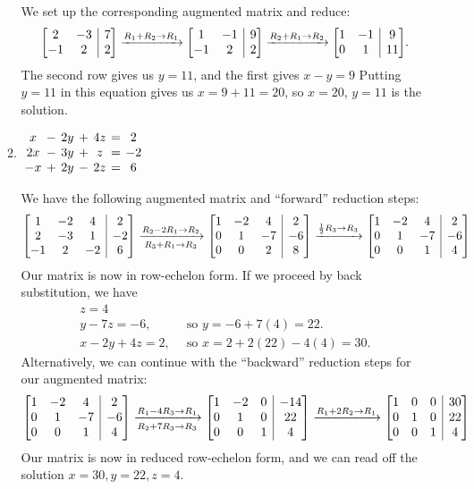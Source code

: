 \documentclass[12pt]{article}
\makeatletter
\newenvironment{amatrix}[1]{%
  \left[\begin{array}{@{}*{#1}{c}|c@{}}
}{%
  \end{array}\right]
}
\newcommand{\bam}{\begin{amatrix}}
\newcommand{\eam}{\end{amatrix}}
\makeatother
\begin{document}
\begin{enumerate}
\begin{enumerate}
We set up the corresponding augmented matrix and reduce:
\[
\bam{2}2&-3&7\\-1&2&2\eam \xrightarrow{R_1+R_2\to R_1} \bam{2} 1&-1&9\\-1&2&2\eam \xrightarrow{R_2+R_1\to R_2}\bam{2}1&-1&9\\0&1&11\eam.
\]
The second row gives us $y=11$, and the first gives $x-y=9$ Putting $y=11$ in this equation gives us $x=9+11=20$, so $x=20$, $y=11$ is the solution.

\item $\arraycolsep2pt\begin{array}{ccccccc}
x&-&2y&+&4z&=&2\\2x&-&3y&+&z&=&-2\\-x&+&2y&-&2z&=&6\end{array}$

We have the following augmented matrix and ``forward'' reduction steps:
\[
\bam{3}
1&-2&4&2\\
2&-3&1&-2\\
-1&2&-2&6
\eam \xrightarrow[R_3+R_1\to R_3]{R_2-2R_1\to R_2}
\bam{3}
1&-2&4&2\\
0&1&-7&-6\\
0&0&2&8
\eam \xrightarrow{\frac12 R_3\to R_3}
\bam{3} 
1&-2&4&2\\
0&1&-7&-6\\
0&0&1&4
\eam
\]
Our matrix is now in row-echelon form. If we proceed by back substitution, we have
\begin{align*}
z=4&\\
y-7z=-6,&\, \text{ so } y=-6+7(4)=22.\\
x-2y+4z=2,&\, \text{ so } x=2+2(22)-4(4)=30.
\end{align*}
Alternatively, we can continue with the ``backward'' reduction steps for our augmented matrix:
\[
\bam{3}
1&-2&4&2\\
0&1&-7&-6\\
0&0&1&4
\eam \xrightarrow[R_2+7R_3\to R_3]{R_1-4R_3\to R_1}
\bam{3}
1&-2&0&-14\\
0&1&0&22\\
0&0&1&4
\eam \xrightarrow{R_1+2R_2\to R_1}
\bam{3}
1&0&0&30\\
0&1&0&22\\
0&0&1&4\eam
\]
Our matrix is now in reduced row-echelon form, and we can read off the solution $x=30, y=22, z=4$.
\end{enumerate}

\end{enumerate}


\newpage
\end{document}
